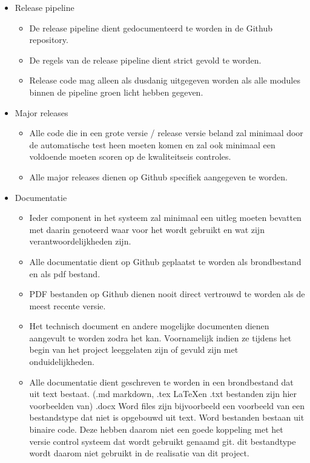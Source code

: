\documentclass[]{report}
\begin{document}
\begin{itemize}
	\item Release pipeline
	\begin{itemize}
		\item De release pipeline dient gedocumenteerd te worden in de Github repository.
		\item De regels van de release pipeline dient strict gevold te worden.
		\item Release code mag alleen als dusdanig uitgegeven worden als alle modules binnen de pipeline groen licht hebben gegeven.
		\newline
	\end{itemize}

	\item Major releases
	\begin{itemize}
		\item Alle code die in een grote versie / release versie beland zal minimaal door de automatische test heen moeten komen en zal ook minimaal een voldoende moeten scoren op de kwaliteitseis controles.
		\item Alle major releases dienen op Github specifiek aangegeven te worden.
		\newline
	\end{itemize}
	
	\item Documentatie
	\begin{itemize}
		\item Ieder component in het systeem zal minimaal een uitleg moeten bevatten met daarin genoteerd waar voor het wordt gebruikt en wat zijn verantwoordelijkheden zijn.
		\item Alle documentatie dient op Github geplaatst te worden als brondbestand en als pdf bestand.
		\item PDF bestanden op Github dienen nooit direct vertrouwd te worden als de meest recente versie.
		\item Het technisch document en andere mogelijke documenten dienen aangevult te worden zodra het kan. Voornamelijk indien ze tijdens het begin van het project leeggelaten zijn of gevuld zijn met onduidelijkheden.
		\item Alle documentatie dient geschreven te worden in een brondbestand dat uit text bestaat. (.md markdown, .tex \LaTeX en .txt bestanden zijn hier voorbeelden van) .docx Word files zijn bijvoorbeeld een voorbeeld van een bestandstype dat niet is opgebouwd uit text. Word bestanden bestaan uit binaire code. Deze hebben daarom niet een goede koppeling met het versie control systeem dat wordt gebruikt genaamd git. dit bestandtype wordt daarom niet gebruikt in de realisatie van dit project.
		\newline
	\end{itemize}


\end{itemize}
\end{document}
